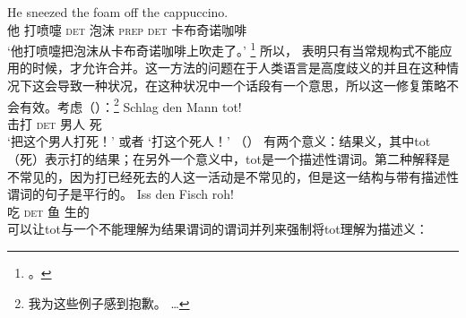 \ea
\gll He sneezed the foam off the cappuccino.\\
     他 打喷嚏 \textsc{det} 泡沫 \textsc{prep} \textsc{det}  卡布奇诺咖啡\\
\glt `他打喷嚏把泡沫从卡布奇诺咖啡上吹走了。'
\footnote{%
 。
}
\z
所以， \citet[--320]{SvT2011a}表明只有当常规构式不能应用的时候，才允许合并。这一方法的问题在于人类语言是高度歧义的并且在这种情况下这会导致一种状况，在这种状况中一个话段有一个意思，所以这一修复策略不会有效。考虑（）：\footnote{%
  我为这些例子感到抱歉。 \ldots
}
\ea
\label{ex-schlag-den-mann-tot}
\gll Schlag den Mann tot!\\
     击打   \textsc{det} 男人  死\\
\glt `把这个男人打死！' 或者 `打这个死人！'
\z
（） 有两个意义：结果义，其中tot（死）表示打的结果；在另外一个意义中，tot是一个描述性谓词。第二种解释是不常见的，因为打已经死去的人这一活动是不常见的，但是这一结构与带有描述性谓词的句子是平行的。
\ea
\gll Iss den Fisch roh!\\
     吃 \textsc{det} 鱼 生的\\
\z
可以让tot与一个不能理解为结果谓词的谓词并列来强制将tot理解为描述义：
